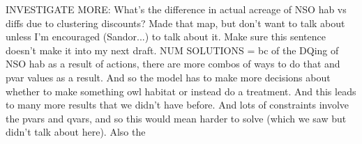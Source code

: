 INVESTIGATE MORE:
What's the difference in actual acreage of NSO hab vs diffs due to clustering discounts? Made that map, but don't want to talk about unless I'm encouraged (Sandor...) to talk about it. Make sure this sentence doesn't make it into my next draft.
NUM SOLUTIONS = bc of the DQing of NSO hab as a result of actions, there are more combos of ways to do that and pvar values as a result. And so the model has to make more decisions about whether to make something owl habitat or instead do a treatment. And this leads to many more results that we didn't have before. And lots of constraints involve the pvars and qvars, and so this would mean harder to solve (which we saw but didn't talk about here). Also the 

%
